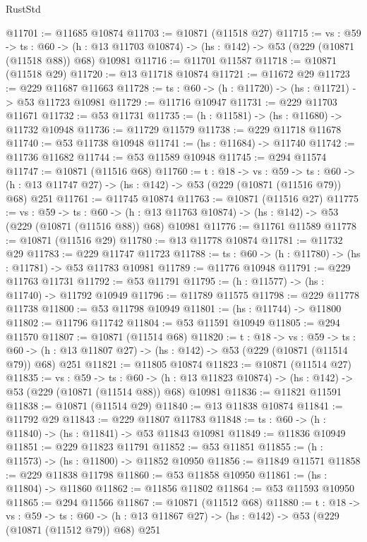 \begin{lexlean}{RustStd}
\begin{coremodule}
@11701 := @11685 @10874
@11703 := @10871 (@11518 @27)
@11715 := {vs : @59} ->
  {ts : @60} ->
  (h : @13 @11703 @10874) -> (hs : @142) -> @53 (@229 (@10871 (@11518 @88)) @68) @10981
@11716 := @11701 @11587
@11718 := @10871 (@11518 @29)
@11720 := @13 @11718 @10874
@11721 := @11672 @29
@11723 := @229 @11687 @11663
@11728 := {ts : @60} -> (h : @11720) -> (hs : @11721) -> @53 @11723 @10981
@11729 := @11716 @10947
@11731 := @229 @11703 @11671
@11732 := @53 @11731
@11735 := (h : @11581) -> (hs : @11680) -> @11732 @10948
@11736 := @11729 @11579
@11738 := @229 @11718 @11678
@11740 := @53 @11738 @10948
@11741 := (hs : @11684) -> @11740
@11742 := @11736 @11682
@11744 := @53 @11589 @10948
@11745 := @294 @11574
@11747 := @10871 (@11516 @68)
@11760 := {t : @18} ->
  {vs : @59} ->
  {ts : @60} -> (h : @13 @11747 @27) -> (hs : @142) -> @53 (@229 (@10871 (@11516 @79)) @68) @251
@11761 := @11745 @10874
@11763 := @10871 (@11516 @27)
@11775 := {vs : @59} ->
  {ts : @60} ->
  (h : @13 @11763 @10874) -> (hs : @142) -> @53 (@229 (@10871 (@11516 @88)) @68) @10981
@11776 := @11761 @11589
@11778 := @10871 (@11516 @29)
@11780 := @13 @11778 @10874
@11781 := @11732 @29
@11783 := @229 @11747 @11723
@11788 := {ts : @60} -> (h : @11780) -> (hs : @11781) -> @53 @11783 @10981
@11789 := @11776 @10948
@11791 := @229 @11763 @11731
@11792 := @53 @11791
@11795 := (h : @11577) -> (hs : @11740) -> @11792 @10949
@11796 := @11789 @11575
@11798 := @229 @11778 @11738
@11800 := @53 @11798 @10949
@11801 := (hs : @11744) -> @11800
@11802 := @11796 @11742
@11804 := @53 @11591 @10949
@11805 := @294 @11570
@11807 := @10871 (@11514 @68)
@11820 := {t : @18} ->
  {vs : @59} ->
  {ts : @60} -> (h : @13 @11807 @27) -> (hs : @142) -> @53 (@229 (@10871 (@11514 @79)) @68) @251
@11821 := @11805 @10874
@11823 := @10871 (@11514 @27)
@11835 := {vs : @59} ->
  {ts : @60} ->
  (h : @13 @11823 @10874) -> (hs : @142) -> @53 (@229 (@10871 (@11514 @88)) @68) @10981
@11836 := @11821 @11591
@11838 := @10871 (@11514 @29)
@11840 := @13 @11838 @10874
@11841 := @11792 @29
@11843 := @229 @11807 @11783
@11848 := {ts : @60} -> (h : @11840) -> (hs : @11841) -> @53 @11843 @10981
@11849 := @11836 @10949
@11851 := @229 @11823 @11791
@11852 := @53 @11851
@11855 := (h : @11573) -> (hs : @11800) -> @11852 @10950
@11856 := @11849 @11571
@11858 := @229 @11838 @11798
@11860 := @53 @11858 @10950
@11861 := (hs : @11804) -> @11860
@11862 := @11856 @11802
@11864 := @53 @11593 @10950
@11865 := @294 @11566
@11867 := @10871 (@11512 @68)
@11880 := {t : @18} ->
  {vs : @59} ->
  {ts : @60} -> (h : @13 @11867 @27) -> (hs : @142) -> @53 (@229 (@10871 (@11512 @79)) @68) @251

\end{coremodule}
\end{lexlean}
